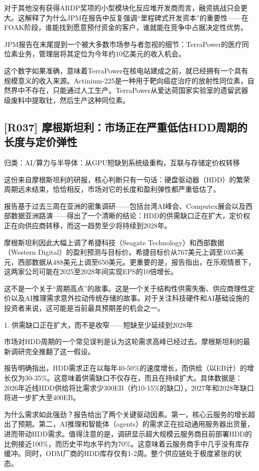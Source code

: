 \documentclass[11pt]{ctexart}
\begin{document}
对于其他没有获得ARDP奖项的小型模块化反应堆开发商而言，融资挑战只会更大。这解释了为什么JPM在报告中反复强调“里程碑式开发资本”的重要性——在FOAK阶段，谁能找到愿意预付资金的客户，谁就能在竞争中占据决定性优势。

JPM报告在末尾提到一个被大多数市场参与者忽视的细节：TerraPower的医疗同位素业务，管理层将其定位为今年约10亿美元的收入机会。

这个数字如果准确，意味着TerraPower在核电站建成之前，就已经拥有一个具有规模意义的收入来源。Actinium-225是一种用于靶向癌症治疗的放射性同位素，自然界中不存在，只能通过人工生产。TerraPower从爱达荷国家实验室的遗留武器级废料中提取钍，然后生产这种同位素。

\subsection{[R037] 摩根斯坦利：市场正在严重低估HDD周期的长度与定价弹性}
{\small\color{refgray}归类：AI/算力与半导体：从GPU短缺到系统级重构，互联与存储定价权转移}

这份来自摩根斯坦利的研报，核心判断只有一句话：硬盘驱动器（HDD）的繁荣周期远未结束，恰恰相反，市场对它的长度和盈利弹性都严重低估了。

报告基于过去三周在亚洲的密集调研——包括台湾AI峰会、Computex展会以及西部数据亚洲路演——得出了一个清晰的结论：HDD的供需缺口正在扩大，定价权正在向供应商转移，而这一趋势至少将持续到2028年。

摩根斯坦利因此大幅上调了希捷科技（Seagate Technology）和西部数据（Western Digital）的盈利预测与目标价。希捷目标价从767美元上调至1035美元，西部数据从488美元上调至650美元。更重要的是，报告指出，在乐观情景下，这两家公司可能在2025至2028年间实现EPS的10倍增长。

这不是一个关于“周期高点”的故事。这是一个关于结构性供需失衡、供应商理性定价以及AI推理需求意外拉动传统存储的故事。对于关注科技硬件和AI基础设施的投资者来说，这可能是当前最具预期差的机会之一。

1. 供需缺口正在扩大，而不是收窄——短缺至少延续到2028年

市场对HDD周期的一个常见误判是认为这轮需求高峰已经过去。摩根斯坦利的最新调研完全推翻了这一假设。

报告明确指出，HDD需求正在以每年40-50\%的速度增长，而供给（以EB计）的增长仅为30-35\%。这意味着供需缺口不仅存在，而且在持续扩大。具体数据是：2026年近线HDD供给将比需求少300EB（约10-15\%的缺口），2027年和2028年缺口将进一步扩大至400EB。

为什么需求如此强劲？报告给出了两个关键驱动因素。第一，核心云服务的增长超出了预期。第二，AI推理和智能体（agents）的需求正在拉动通用服务器出货量，进而带动HDD需求。值得注意的是，调研显示超大规模云服务商目前部署HDD的比例接近100\%，而历史平均水平约为70\%。这意味着云服务商手中几乎没有库存缓冲。同时，ODM厂商的HDD库存仅有1-2周。整个供应链处于极度紧张的状态。
\end{document}
